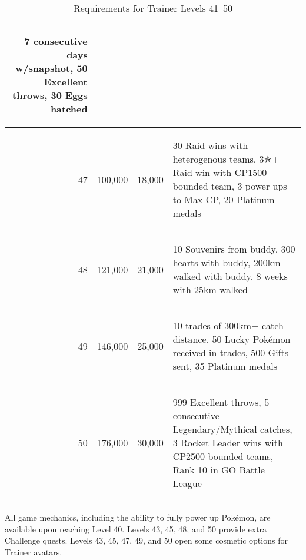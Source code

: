 \begin{table}[ht]
\begin{center}
\begin{tabular}{r r r l}
\begin{varwidth}{\dimexpr0.5\linewidth}
                       7 consecutive days w/snapshot,
                       50 Excellent throws,
                       30 Eggs hatched
                       \end{varwidth} \\
                       \hline
47 & 100,000 & 18,000 & \begin{varwidth}{\dimexpr0.5\linewidth}
                        30 Raid wins with heterogenous teams,
                        3{\symbolfont ✯}+ Raid win with CP1500-bounded team,
                        3 power ups to Max CP,
                        20 Platinum medals
                        \end{varwidth}\\
                       \hline
48 & 121,000 & 21,000 & \begin{varwidth}{\dimexpr0.5\linewidth}
                        10 Souvenirs from buddy,
                        300 hearts with buddy,
                        200km walked with buddy,
                        8 weeks with 25km walked
                        \end{varwidth}\\
                       \hline
49 & 146,000 & 25,000 & \begin{varwidth}{\dimexpr0.5\linewidth}
                        10 trades of 300km+ catch distance,
                        50 Lucky Pokémon received in trades,
                        500 Gifts sent,
                        35 Platinum medals
                        \end{varwidth}\\
                       \hline
50 & 176,000 & 30,000 & \begin{varwidth}{\dimexpr0.5\linewidth}
                        999 Excellent throws,
                        5 consecutive Legendary/Mythical catches,
                        3 Rocket Leader wins with CP2500-bounded teams,
                        Rank 10 in GO Battle League
                        \end{varwidth}\\
\end{tabular}
\caption{Requirements for Trainer Levels 41--50}
\label{table:xp41plus}
\end{center}
\end{table}

All game mechanics, including the ability to fully power up Pokémon,
 are available upon reaching Level 40.
Levels 43, 45, 48, and 50 provide extra Challenge quests.
Levels 43, 45, 47, 49, and 50 open some cosmetic options for Trainer avatars.

